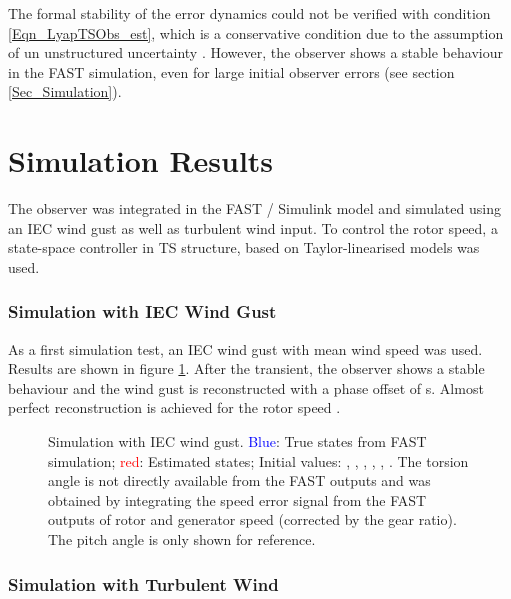 \documentclass[a4paper]{article}
\newcommand{\regsym}{\textsuperscript{\textregistered}}
\begin{document}
The formal stability of the error dynamics could not be verified with condition \eqref{Eqn_LyapTSObs_est}, which is a conservative condition due to the assumption of un unstructured uncertainty \cite{Lendek:2010}. However, the observer shows a stable behaviour in the FAST simulation, even for large initial observer errors (see section \ref{Sec_Simulation}).




\section{\label{Sec_Simulation}Simulation Results}

The observer was integrated in the FAST / Simulink{\regsym} model and simulated using an IEC wind gust as well as turbulent wind input. To control the rotor speed, a state-space controller in TS structure, based on Taylor-linearised models was used.

\subsubsection{Simulation with IEC Wind Gust}

As a first simulation test, an IEC wind gust with mean wind speed  was used. Results are shown in figure \ref{Figs_obs_FAST}. 
After the transient, the observer shows a stable behaviour and the wind gust is reconstructed with a phase offset of  s. Almost perfect reconstruction is achieved for the rotor speed .


\begin{figure}[htbp!]
\centerline{}
\vfil
{}
\hfil
{}
\hfil
{}
\caption{Simulation with IEC wind gust. \textcolor{blue}{Blue}: True states from FAST simulation; \textcolor{red}{red}: Estimated states; Initial values:
			, , ,
			, ,
			. {The torsion angle is not directly available from the FAST outputs and was obtained by
			integrating the speed error signal from the FAST outputs of rotor and generator speed (corrected by the gear ratio). The pitch angle is only shown for reference.}}
\label{Figs_obs_FAST}
\end{figure}


\subsubsection{Simulation with Turbulent Wind}
\end{document}
